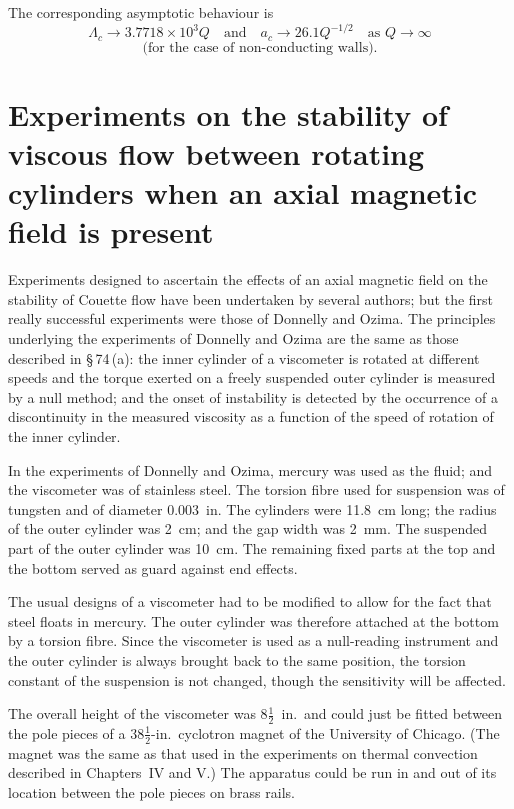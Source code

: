 The corresponding asymptotic behaviour is
\begin{equation}
\Lambda_c \to 3.7718 \times 10^3 Q \quad \text{and} \quad a_c \to 26.1 Q^{-1/2} \quad \text{as } Q \to \infty \label{eq:9-312}
\end{equation}
\[
\text{(for the case of non-conducting walls).}
\]

\section{Experiments on the stability of viscous flow between rotating cylinders when an axial magnetic field is present}
\label{sec:89}

Experiments designed to ascertain the effects of an axial magnetic field on the stability of Couette flow have been undertaken by several authors; but the first really successful experiments were those of Donnelly and Ozima. The principles underlying the experiments of Donnelly and Ozima are the same as those described in \S\,74\,(a): the inner cylinder of a viscometer is rotated at different speeds and the torque exerted on a freely suspended outer cylinder is measured by a null method; and the onset of instability is detected by the occurrence of a discontinuity in the measured viscosity as a function of the speed of rotation of the inner cylinder.

In the experiments of Donnelly and Ozima, mercury was used as the fluid; and the viscometer was of stainless steel. The torsion fibre used for suspension was of tungsten and of diameter 0.003~in. The cylinders were 11.8~cm long; the radius of the outer cylinder was 2~cm; and the gap width was 2~mm. The suspended part of the outer cylinder was 10~cm. The remaining fixed parts at the top and the bottom served as guard against end effects.

The usual designs of a viscometer had to be modified to allow for the fact that steel floats in mercury. The outer cylinder was therefore attached at the bottom by a torsion fibre. Since the viscometer is used as a null-reading instrument and the outer cylinder is always brought back to the same position, the torsion constant of the suspension is not changed, though the sensitivity will be affected.

The overall height of the viscometer was $8\frac{1}{2}$~in.\ and could just be fitted between the pole pieces of a $38\frac{1}{2}$-in.\ cyclotron magnet of the University of Chicago. (The magnet was the same as that used in the experiments on thermal convection described in Chapters~IV and V.) The apparatus could be run in and out of its location between the pole pieces on brass rails.

